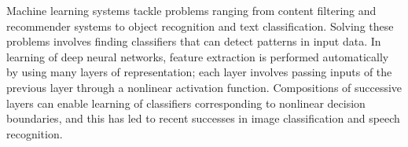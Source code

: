 Machine learning systems tackle problems ranging from content filtering and recommender systems to object recognition and text classification.  Solving these problems involves finding classifiers that can detect patterns in input data.  In learning of deep neural networks, feature extraction is performed automatically by using many layers of representation; each layer involves passing inputs of the previous layer through a nonlinear activation function.  Compositions of successive layers can enable learning of classifiers corresponding to nonlinear decision boundaries, and this has led to recent successes in image classification and speech recognition.
